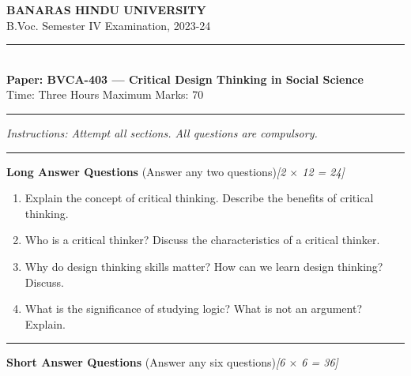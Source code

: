 \documentclass[11pt,a4paper]{article}
\newcommand{\pts}[1]{\hfill   \textit{[#1]}}
\begin{document}
\begin{center}
  {\large\bfseries BANARAS HINDU UNIVERSITY}\\[2pt]
  {\normalsize B.Voc. Semester IV Examination, 2023-24}\\[6pt]
  \rule{0.8\linewidth}{0.5pt}\\[6pt]
  {\large\bfseries Paper: BVCA-403 --- Critical Design Thinking in Social Science}\\[4pt]
  {\normalsize Time: Three Hours \hfill Maximum Marks: 70}
\end{center}

\rule{\linewidth}{0.4pt}

\smallskip



\noindent   \textit{Instructions: Attempt all sections. All questions are compulsory.}

\bigskip

\bigskip



\rule{\linewidth}{0.4pt}\smallskip




\noindent   \textbf{Long Answer Questions} (Answer any two questions)\pts{2 $ \times$ 12 = 24}

\begin{enumerate}[label=\arabic*.,leftmargin=*,itemsep=8pt]
  \item Explain the concept of critical thinking. Describe the benefits of critical thinking.
  \item Who is a critical thinker? Discuss the characteristics of a critical thinker.
  \item Why do design thinking skills matter? How can we learn design thinking? Discuss.
  \item What is the significance of studying logic? What is not an argument? Explain.
\end{enumerate}

\bigskip



\rule{\linewidth}{0.4pt}\smallskip




\noindent   \textbf{Short Answer Questions} (Answer any six questions)\pts{6 $ \times$ 6 = 36}
\end{document}
